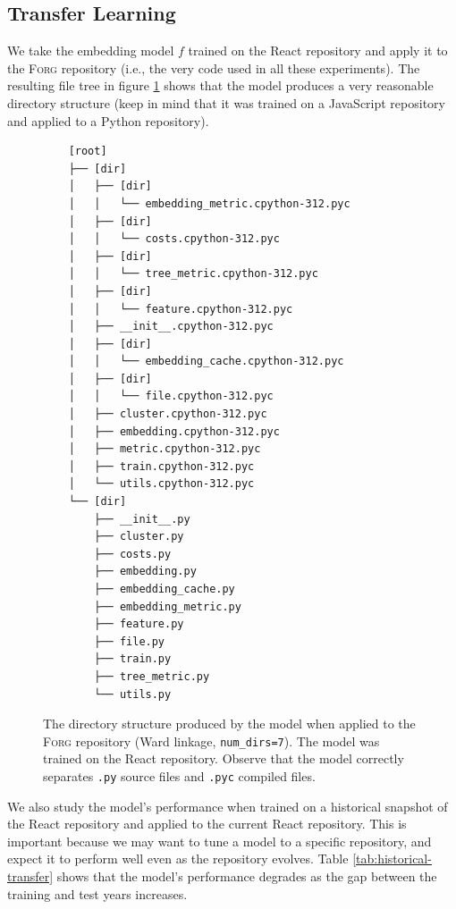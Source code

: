 \documentclass{article}
\begin{document}
\subsection{Transfer Learning}

We take the embedding model $f$ trained on the React repository and apply it to the \textsc{Forg} repository (i.e., the very code used in all these experiments). The resulting file tree in figure \ref{fig:forg-directory-structure} shows that the model produces a very reasonable directory structure (keep in mind that it was trained on a JavaScript repository and applied to a Python repository).

\begin{figure}[ht]
  \centering
  \begin{BVerbatim}
    [root]
    ├── [dir]
    │   ├── [dir]
    │   │   └── embedding_metric.cpython-312.pyc
    │   ├── [dir]
    │   │   └── costs.cpython-312.pyc
    │   ├── [dir]
    │   │   └── tree_metric.cpython-312.pyc
    │   ├── [dir]
    │   │   └── feature.cpython-312.pyc
    │   ├── __init__.cpython-312.pyc
    │   ├── [dir]
    │   │   └── embedding_cache.cpython-312.pyc
    │   ├── [dir]
    │   │   └── file.cpython-312.pyc
    │   ├── cluster.cpython-312.pyc
    │   ├── embedding.cpython-312.pyc
    │   ├── metric.cpython-312.pyc
    │   ├── train.cpython-312.pyc
    │   └── utils.cpython-312.pyc
    └── [dir]
        ├── __init__.py
        ├── cluster.py
        ├── costs.py
        ├── embedding.py
        ├── embedding_cache.py
        ├── embedding_metric.py
        ├── feature.py
        ├── file.py
        ├── train.py
        ├── tree_metric.py
        └── utils.py
  \end{BVerbatim}
  \caption{The directory structure produced by the model when applied to the \textsc{Forg} repository (Ward linkage, \texttt{num\_dirs=7}). The model was trained on the React repository. Observe that the model correctly separates \texttt{.py} source files and \texttt{.pyc} compiled files.}
  \label{fig:forg-directory-structure}
\end{figure}

We also study the model's performance when trained on a historical snapshot of the React repository and applied to the current React repository. This is important because we may want to tune a model to a specific repository, and expect it to perform well even as the repository evolves. Table \ref{tab:historical-transfer} shows that the model's performance degrades as the gap between the training and test years increases.
\end{document}
